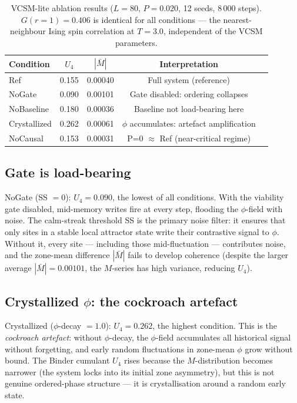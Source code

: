 \documentclass[12pt,a4paper]{article}
\begin{document}
\begin{table}[h]
\centering
\caption{VCSM-lite ablation results ($L=80$, $P=0.020$, 12 seeds, 8\,000 steps).
$G(r=1) = 0.406$ is identical for all conditions
--- the nearest-neighbour Ising spin correlation at $T=3.0$,
independent of the VCSM parameters.}
\label{tab:ablation}
\begin{tabular}{lcccc}
\toprule
Condition & $U_4$ & $|\bar{M}|$ & Interpretation \\
\midrule
Ref          & 0.155 & 0.00040 & Full system (reference) \\
NoGate       & 0.090 & 0.00101 & Gate disabled: ordering collapses \\
NoBaseline   & 0.180 & 0.00036 & Baseline not load-bearing here \\
Crystallized & 0.262 & 0.00061 & $\phi$ accumulates: artefact amplification \\
NoCausal     & 0.153 & 0.00031 & P=0 $\approx$ Ref (near-critical regime) \\
\bottomrule
\end{tabular}
\end{table}

\subsection{Gate is load-bearing}

NoGate (SS $= 0$): $U_4 = 0.090$, the lowest of all conditions.
With the viability gate disabled, mid-memory writes fire at every step,
flooding the $\phi$-field with noise.
The calm-streak threshold SS is the primary noise filter:
it ensures that only sites in a stable local attractor state
write their contrastive signal to $\phi$.
Without it, every site --- including those mid-fluctuation ---
contributes noise, and the zone-mean difference $|\bar{M}|$ fails to
develop coherence (despite the larger average $|\bar{M}| = 0.00101$,
the $M$-series has high variance, reducing $U_4$).

\subsection{Crystallized $\phi$: the cockroach artefact}

Crystallized ($\phi$-decay $= 1.0$): $U_4 = 0.262$, the highest condition.
This is the \emph{cockroach artefact}: without $\phi$-decay,
the $\phi$-field accumulates all historical signal without forgetting,
and early random fluctuations in zone-mean $\phi$ grow without bound.
The Binder cumulant $U_4$ rises because the $M$-distribution becomes
narrower (the system locks into its initial zone asymmetry),
but this is not genuine ordered-phase structure ---
it is crystallisation around a random early state.
\end{document}
